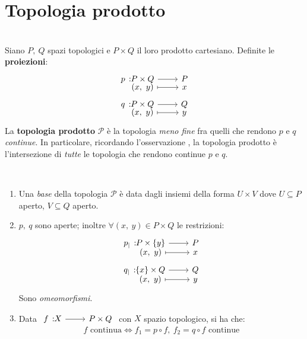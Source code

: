 \section{Topologia prodotto}
\begin{define}~{}\\
Siano $P,\ Q$ spazi topologici e $P\times Q$ il loro prodotto cartesiano. Definite le \textbf{proiezioni}:
\begin{gather}
\funztot{p}{P\times Q}{P}{\left(x,\ y\right)}{x}\\
\funztot{q}{P\times Q}{Q}{\left(x,\ y\right)}{y}
\end{gather}
La \textbf{topologia prodotto} $\mathcal{P}$ è la topologia \textit{meno fine} fra quelli che rendono $p$ e $q$ \textit{continue}. In particolare, ricordando l'osservazione \pageref{intersezionetopo}, la topologia prodotto è l'intersezione di \textit{tutte} le topologia che rendono continue $p$ e $q$.
\end{define}
\begin{theorema}\label{topprodotto}~{}
\begin{enumerate}
\item Una \textit{base} della topologia $\mathcal{P}$ è data dagli insiemi della forma $U\times V$ dove $U\subseteq P$ aperto, $V\subseteq Q$ aperto.
\item $p,\ q$ sono aperte; inoltre $\forall \left(x,\ y\right)\in P\times Q$ le restrizioni:
\begin{gather}
\funztot{p_{\mid}}{P\times \left\{y\right\}}{P}{\left(x,\ y\right)}{x}\\
\funztot{q_{\mid}}{\left\{x\right\}\times Q}{Q}{\left(x,\ y\right)}{y}
\end{gather}
Sono \textit{omeomorfismi}.\\
\item Data $\funz{f}{X}{P\times Q}$ con $X$ spazio topologico, si ha che:
\begin{equation}
f\text{ continua}\iff f_1=p\circ f,\ f_2=q\circ f\text{ continue}
\end{equation}
\end{enumerate}
\vspace{-6mm}
\end{theorema}
